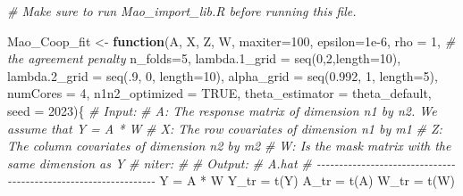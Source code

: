 \documentclass[
]{article}
\newenvironment{Shaded}{\begin{snugshade}}{\end{snugshade}}
\newcommand{\AttributeTok}[1]{\textcolor[rgb]{0.77,0.63,0.00}{#1}}
\newcommand{\CommentTok}[1]{\textcolor[rgb]{0.56,0.35,0.01}{\textit{#1}}}
\newcommand{\ConstantTok}[1]{\textcolor[rgb]{0.00,0.00,0.00}{#1}}
\newcommand{\ControlFlowTok}[1]{\textcolor[rgb]{0.13,0.29,0.53}{\textbf{#1}}}
\newcommand{\DecValTok}[1]{\textcolor[rgb]{0.00,0.00,0.81}{#1}}
\newcommand{\FloatTok}[1]{\textcolor[rgb]{0.00,0.00,0.81}{#1}}
\newcommand{\FunctionTok}[1]{\textcolor[rgb]{0.00,0.00,0.00}{#1}}
\newcommand{\NormalTok}[1]{#1}
\newcommand{\OtherTok}[1]{\textcolor[rgb]{0.56,0.35,0.01}{#1}}
\newcommand{\SpecialCharTok}[1]{\textcolor[rgb]{0.00,0.00,0.00}{#1}}
\begin{document}
\begin{Shaded}
\begin{Highlighting}[]
\CommentTok{\# Make sure to run Mao\_import\_lib.R before running this file.}

\NormalTok{Mao\_Coop\_fit }\OtherTok{\textless{}{-}} \ControlFlowTok{function}\NormalTok{(A, X, Z, W, }\AttributeTok{maxiter=}\DecValTok{100}\NormalTok{, }\AttributeTok{epsilon=}\FloatTok{1e{-}6}\NormalTok{,}
                         \AttributeTok{rho =} \DecValTok{1}\NormalTok{, }\CommentTok{\# the agreement penalty}
                         \AttributeTok{n\_folds=}\DecValTok{5}\NormalTok{,}
                         \AttributeTok{lambda.1\_grid =} \FunctionTok{seq}\NormalTok{(}\DecValTok{0}\NormalTok{,}\DecValTok{2}\NormalTok{,}\AttributeTok{length=}\DecValTok{10}\NormalTok{),}
                         \AttributeTok{lambda.2\_grid =} \FunctionTok{seq}\NormalTok{(.}\DecValTok{9}\NormalTok{, }\DecValTok{0}\NormalTok{, }\AttributeTok{length=}\DecValTok{10}\NormalTok{),}
                         \AttributeTok{alpha\_grid =} \FunctionTok{seq}\NormalTok{(}\FloatTok{0.992}\NormalTok{, }\DecValTok{1}\NormalTok{, }\AttributeTok{length=}\DecValTok{5}\NormalTok{),}
                         \AttributeTok{numCores =} \DecValTok{4}\NormalTok{,}
                         \AttributeTok{n1n2\_optimized =} \ConstantTok{TRUE}\NormalTok{,}
                         \AttributeTok{theta\_estimator =}\NormalTok{ theta\_default,}
                         \AttributeTok{seed =} \DecValTok{2023}\NormalTok{)\{}
   \CommentTok{\#\textquotesingle{} Input:}
   \CommentTok{\#\textquotesingle{}       A: The response matrix of dimension n1 by n2. We assume that Y = A * W}
   \CommentTok{\#\textquotesingle{}       X: The row covariates of dimension n1 by m1}
   \CommentTok{\#\textquotesingle{}       Z: The column covariates of dimension n2 by m2}
   \CommentTok{\#\textquotesingle{}       W: Is the mask matrix with the same dimension as Y}
   \CommentTok{\#\textquotesingle{}       niter:}
   \CommentTok{\#\textquotesingle{} }
   \CommentTok{\#\textquotesingle{} Output:}
   \CommentTok{\#\textquotesingle{}       A.hat}
   \CommentTok{\#\textquotesingle{} {-}{-}{-}{-}{-}{-}{-}{-}{-}{-}{-}{-}{-}{-}{-}{-}{-}{-}{-}{-}{-}{-}{-}{-}{-}{-}{-}{-}{-}{-}{-}{-}{-}{-}{-}{-}{-}{-}{-}{-}{-}{-}{-}{-}{-}{-}{-}{-}{-}{-}{-}{-}{-}{-}{-}{-}{-}{-}{-}{-}{-}{-}{-}{-}}
\NormalTok{   Y }\OtherTok{=}\NormalTok{ A }\SpecialCharTok{*}\NormalTok{ W}
\NormalTok{   Y\_tr }\OtherTok{=} \FunctionTok{t}\NormalTok{(Y)}
\NormalTok{   A\_tr }\OtherTok{=} \FunctionTok{t}\NormalTok{(A)}
\NormalTok{   W\_tr }\OtherTok{=} \FunctionTok{t}\NormalTok{(W)}

\end{Highlighting}
\end{Shaded}
\end{document}
